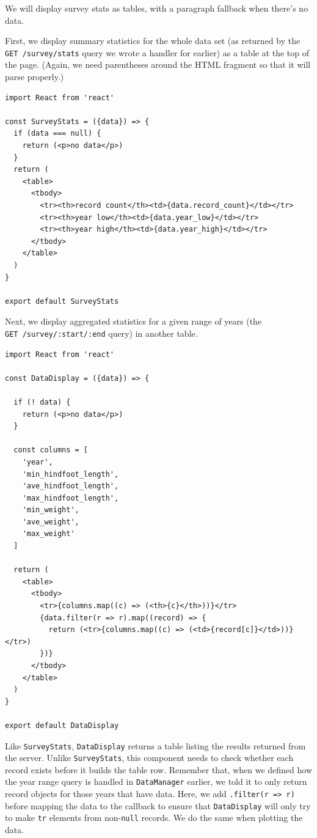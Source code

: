 We will display survey stats as tables, with a paragraph fallback when
there's no data.

First, we display summary statistics for the whole data set (as returned
by the \texttt{GET\ /survey/stats} query we wrote a handler for earlier)
as a table at the top of the page. (Again, we need parentheses around
the HTML fragment so that it will parse properly.)

\begin{verbatim}
import React from 'react'

const SurveyStats = ({data}) => {
  if (data === null) {
    return (<p>no data</p>)
  }
  return (
    <table>
      <tbody>
        <tr><th>record count</th><td>{data.record_count}</td></tr>
        <tr><th>year low</th><td>{data.year_low}</td></tr>
        <tr><th>year high</th><td>{data.year_high}</td></tr>
      </tbody>
    </table>
  )
}

export default SurveyStats
\end{verbatim}

Next, we display aggregated statistics for a given range of years (the
\texttt{GET\ /survey/:start/:end} query) in another table.

\begin{verbatim}
import React from 'react'

const DataDisplay = ({data}) => {

  if (! data) {
    return (<p>no data</p>)
  }

  const columns = [
    'year',
    'min_hindfoot_length',
    'ave_hindfoot_length',
    'max_hindfoot_length',
    'min_weight',
    'ave_weight',
    'max_weight'
  ]

  return (
    <table>
      <tbody>
        <tr>{columns.map((c) => (<th>{c}</th>))}</tr>
        {data.filter(r => r).map((record) => {
          return (<tr>{columns.map((c) => (<td>{record[c]}</td>))}</tr>)
        })}
      </tbody>
    </table>
  )
}

export default DataDisplay
\end{verbatim}

Like \texttt{SurveyStats}, \texttt{DataDisplay} returns a table listing
the results returned from the server. Unlike \texttt{SurveyStats}, this
component needs to check whether each record exists before it builds the
table row. Remember that, when we defined how the year range query is
handled in \texttt{DataManager} earlier, we told it to only return
record objects for those years that have data. Here, we add
\texttt{.filter(r\ =\textgreater{}\ r)} before mapping the data to the
callback to ensure that \texttt{DataDisplay} will only try to make
\texttt{tr} elements from non-\texttt{null} records. We do the same when
plotting the data.


